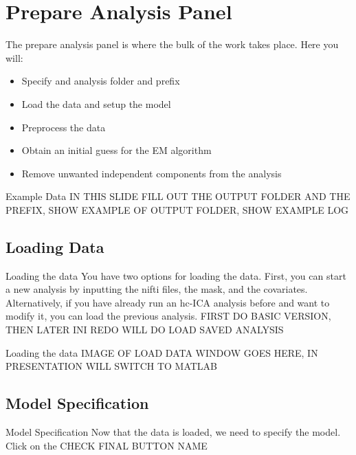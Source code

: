 \documentclass[11pt]{beamer}
\begin{document}
\section{Prepare Analysis Panel}

\begin{frame}
The prepare analysis panel is where the bulk of the work takes place. Here you will:
\begin{itemize}
\item Specify and analysis folder and prefix
\item Load the data and setup the model
\item Preprocess the data
\item Obtain an initial guess for the EM algorithm
\item Remove unwanted independent components from the analysis
\end{itemize}
\end{frame}

\begin{frame}{Example Data}
IN THIS SLIDE FILL OUT THE OUTPUT FOLDER AND THE PREFIX, SHOW EXAMPLE OF OUTPUT FOLDER, SHOW EXAMPLE LOG
\end{frame}

\subsection{Loading Data}
\begin{frame}{Loading the data}
You have two options for loading the data. First, you can start a new analysis by inputting the nifti files, the mask, and the covariates. Alternatively, if you have already run an hc-ICA analysis before and want to modify it, you can load the previous analysis. FIRST DO BASIC VERSION, THEN LATER INI REDO WILL DO LOAD SAVED ANALYSIS
\end{frame}

\begin{frame}{Loading the data}
IMAGE OF LOAD DATA WINDOW GOES HERE, IN PRESENTATION WILL SWITCH TO MATLAB
\end{frame}

\subsection{Model Specification}
\begin{frame}{Model Specification}
Now that the data is loaded, we need to specify the model. Click on the CHECK FINAL BUTTON NAME
\end{frame}
\end{document}
